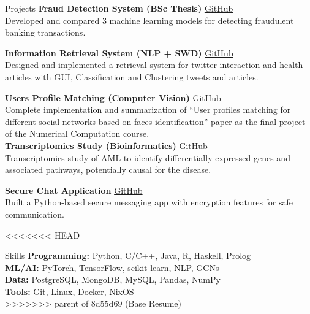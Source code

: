 \documentclass{resume}
\begin{document}

\begin{rSection}{Projects}
\textbf{Fraud Detection System (BSc Thesis)} \hfill \href{https://github.com/kahbodaeini/Fraud-Detection}{GitHub} \\
Developed and compared 3 machine learning models for detecting fraudulent banking transactions.

\textbf{Information Retrieval System (NLP + SWD)} \hfill \href{https://github.com/IR1401-Spring-Final-Projects/SocialMediaHealth1401-19_39}{GitHub} \\
Designed and implemented a retrieval system for twitter interaction and health articles with GUI, Classification and Clustering tweets and articles.

\textbf{Users Profile Matching (Computer Vision)} \hfill \href{https://github.com/kahbodaeini/Users_profile_matching}{GitHub}\\
Complete implementation and summarization of “User profiles matching for different social networks based on faces identification” paper as the final project of the Numerical Computation course. 
\\
\textbf{Transcriptomics Study (Bioinformatics)} \hfill \href{https://github.com/kahbodaeini/AML_Leukemia}{GitHub}\\
Transcriptomics study of AML to identify differentially expressed genes and associated pathways, potentially causal for the disease.

\textbf{Secure Chat Application} \hfill \href{https://github.com/rerfan24/DNS-project}{GitHub} \\
Built a Python-based secure messaging app with encryption features for safe communication.

<<<<<<< HEAD
=======

\begin{rSection}{Skills}
\textbf{Programming:} Python, C/C++, Java, R, Haskell, Prolog \\
\textbf{ML/AI:} PyTorch, TensorFlow, scikit-learn, NLP, GCNs \\
\textbf{Data:} PostgreSQL, MongoDB, MySQL, Pandas, NumPy \\
\textbf{Tools:} Git, Linux, Docker, NixOS \\
>>>>>>> parent of 8d55d69 (Base Resume)
\end{rSection}


\end{rSection}
\end{document}
